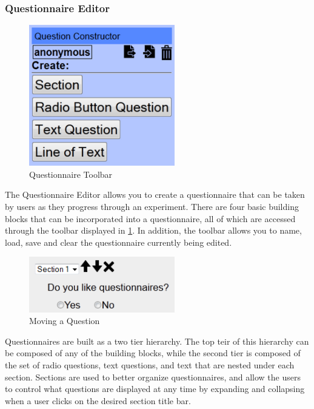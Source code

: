 \documentclass[article]{ij4uq}              %
\begin{document}
\subsubsection {Questionnaire Editor}

\begin{figure}[h!]
 \centering
 \includegraphics[width=2.5in]{figures/question_toolbar.png}
 \caption{Questionnaire Toolbar}
 \label{fig:questTool}
\end{figure}
\FloatBarrier

The Questionnaire Editor allows you to create a questionnaire that can be taken by users as they progress through an experiment. There are four basic building blocks that can be incorporated into a questionnaire, all of which are accessed through the toolbar displayed in \ref{fig:questTool}. In addition, the toolbar allows you to name, load, save and clear the questionnaire currently being edited.

\begin{figure}[h!]
 \centering
 \includegraphics[width=2.5in]{figures/question_edit.png}
 \caption{Moving a Question}
 \label{fig:questEdit}
\end{figure}
\FloatBarrier

Questionnaires are built as a two tier hierarchy.  The top teir of this hierarchy can be composed of any of the building blocks, while the second tier is composed of the set of radio questions, text questions, and text that are nested under each section.  Sections are used to better organize questionnaires, and allow the users to control what questions are displayed at any time by expanding and collapsing when a user clicks on the desired section title bar.  
\end{document}
